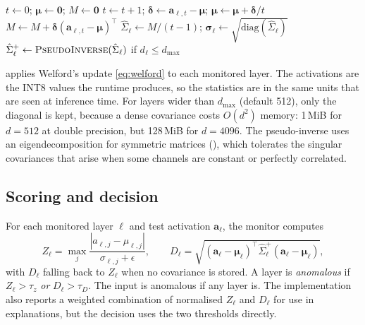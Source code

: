\begin{algorithm}[t]
\caption{\textsc{Calibrate}$(\{\mathbf{a}_{\ell,t}\}, d_{\max})$}
\label{alg:calibrate}
\begin{algorithmic}[1]
  \State $t \gets 0$; $\boldsymbol\mu \gets \mathbf{0}$; $M \gets \mathbf{0}$
   
    \State $t \gets t+1$; $\boldsymbol\delta \gets \mathbf{a}_{\ell,t} - \boldsymbol\mu$; $\boldsymbol\mu \gets \boldsymbol\mu + \boldsymbol\delta/t$
    \State $M \gets M + \boldsymbol\delta(\mathbf{a}_{\ell,t}-\boldsymbol\mu)^\top$ 
  \EndFor
  \State $\hat\Sigma_\ell \gets M/(t-1)$; $\boldsymbol\sigma_\ell \gets \sqrt{\mathrm{diag}(\hat\Sigma_\ell)}$
  \State $\hat\Sigma_\ell^{+} \gets \textsc{PseudoInverse}(\hat\Sigma_\ell)$ if $d_\ell \le d_{\max}$
\EndFor
\end{algorithmic}
\end{algorithm}

 applies Welford's update \cref{eq:welford} to each monitored layer. The
activations are the INT8 values the runtime produces, so the statistics are in the same units
that are seen at inference time. For layers wider than $d_{\max}$ (default 512), only the
diagonal is kept, because a dense covariance costs $O(d^2)$ memory: 1\,MiB for $d=512$ at double
precision, but 128\,MiB for $d=4096$. The pseudo-inverse uses an eigendecomposition for symmetric
matrices (), which tolerates the singular covariances that arise when
some channels are constant or perfectly correlated.

\subsection{Scoring and decision}

For each monitored layer $\ell$ and test activation $\mathbf{a}_\ell$, the monitor computes
\begin{equation}
  Z_\ell = \max_j \frac{|a_{\ell,j}-\mu_{\ell,j}|}{\sigma_{\ell,j}+\epsilon},
  \qquad
  D_\ell = \sqrt{(\mathbf{a}_\ell-\boldsymbol\mu_\ell)^\top\hat\Sigma_\ell^{+}(\mathbf{a}_\ell-\boldsymbol\mu_\ell)},
  \label{eq:scores}
\end{equation}
with $D_\ell$ falling back to $Z_\ell$ when no covariance is stored. A layer is \emph{anomalous}
if $Z_\ell>\tau_z$ \emph{or} $D_\ell>\tau_D$. The input is anomalous if any layer is. The
implementation also reports a weighted combination of normalised $Z_\ell$ and $D_\ell$ for use in
explanations, but the decision uses the two thresholds directly.

